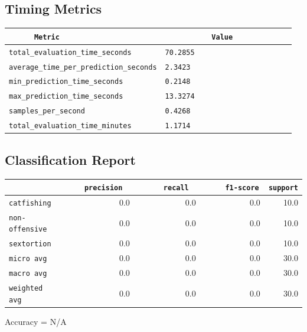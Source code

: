 \documentclass{article}
\begin{document}
\subsection{Timing Metrics}

\begin{center}
\begin{tabular}{l | l} \hline
    \verb|      Metric     | & \verb|           Value           | \\ \hline
    \hline
    \verb|total_evaluation_time_seconds| & \verb|70.2855                      | \\ \hline
    \verb|average_time_per_prediction_seconds| & \verb|2.3423                       | \\ \hline
    \verb|min_prediction_time_seconds| & \verb|0.2148                       | \\ \hline
    \verb|max_prediction_time_seconds| & \verb|13.3274                      | \\ \hline
    \verb|samples_per_second| & \verb|0.4268                       | \\ \hline
    \verb|total_evaluation_time_minutes| & \verb|1.1714                       | \\ \hline
\end{tabular}
\end{center}

\subsection{Classification Report}

\begin{center}
\begin{tabular}{l | r | r | r | r} \hline
    \verb|            | & \verb|    precision     | & \verb|      recall      | & \verb|     f1-score     | & \verb|support| \\ \hline
    \hline
    \verb|catfishing | & 0.0 & 0.0 & 0.0 &    10.0 \\ \hline
    \verb|non-offensive| & 0.0 & 0.0 & 0.0 &    10.0 \\ \hline
    \verb|sextortion | & 0.0 & 0.0 & 0.0 &    10.0 \\ \hline
    \verb|micro avg  | & 0.0 & 0.0 & 0.0 &    30.0 \\ \hline
    \verb|macro avg  | & 0.0 & 0.0 & 0.0 &    30.0 \\ \hline
    \verb|weighted avg| & 0.0 & 0.0 & 0.0 &    30.0 \\ \hline
\end{tabular}
\end{center}

\begin{center}
Accuracy = N/A
\end{center}
\end{document}
